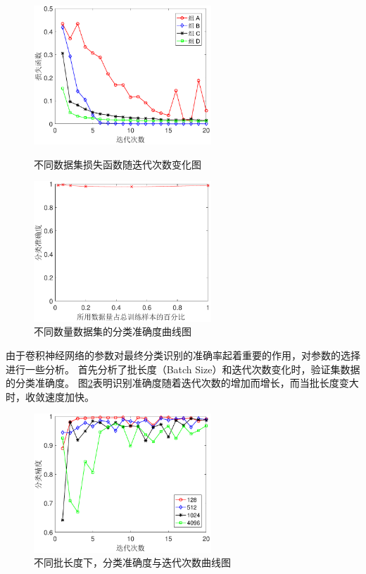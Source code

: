 \begin{figure}[hbt]
	\centering
	\begin{minipage}{7cm}
		\includegraphics[width=6.67cm]{figures/othr/group_results}
		\caption{不同数据集损失函数随迭代次数变化图}
		\label{fig:group_results}
	\end{minipage}
	\hspace{10pt}
	\begin{minipage}{7cm}
		\includegraphics[width=6.67cm]{figures/othr/sizes}
		\caption{不同数量数据集的分类准确度曲线图}
		\label{fig:sizes}
	\end{minipage}

\end{figure}


由于卷积神经网络的参数对最终分类识别的准确率起着重要的作用，对参数的选择进行一些分析。
首先分析了批长度（Batch Size）和迭代次数变化时，验证集数据的分类准确度。
图\ref{fig:epoch}表明识别准确度随着迭代次数的增加而增长，而当批长度变大时，收敛速度加快。
\begin{figure}[hbt]
	\centering
	\includegraphics[width=6.67cm]{figures/othr/epoch}
	\caption{不同批长度下，分类准确度与迭代次数曲线图}
	\label{fig:epoch}
\end{figure}


